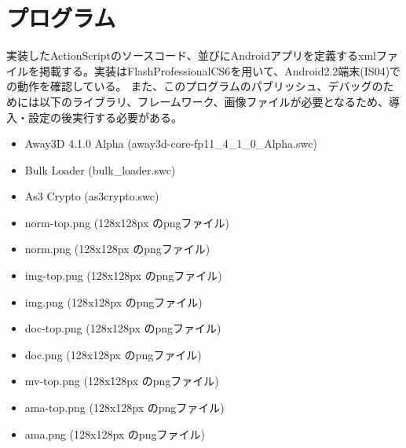 \chapter{プログラム}
実装したActionScriptのソースコード、並びにAndroidアプリを定義するxmlファイルを掲載する。実装はFlashProfessionalCS6を用いて、Android2.2端末(IS04)での動作を確認している。
また、このプログラムのパブリッシュ、デバッグのためには以下のライブラリ、フレームワーク、画像ファイルが必要となるため、導入・設定の後実行する必要がある。
\begin{itemize}
\item Away3D 4.1.0 Alpha (away3d-core-fp11\_4\_1\_0\_Alpha.swc)\cite{away3d}
\item Bulk Loader (bulk\_loader.swc)\cite{bulkloader}
\item As3 Crypto (as3crypto.swc)\cite{as3crypto}
\item norm-top.png (128x128px のpngファイル)
\item norm.png (128x128px のpngファイル)
\item img-top.png (128x128px のpngファイル)
\item img.png (128x128px のpngファイル)
\item doc-top.png (128x128px のpngファイル)
\item doc.png (128x128px のpngファイル)
\item mv-top.png (128x128px のpngファイル)
\item ama-top.png (128x128px のpngファイル)
\item ama.png (128x128px のpngファイル)
\end{itemize}

